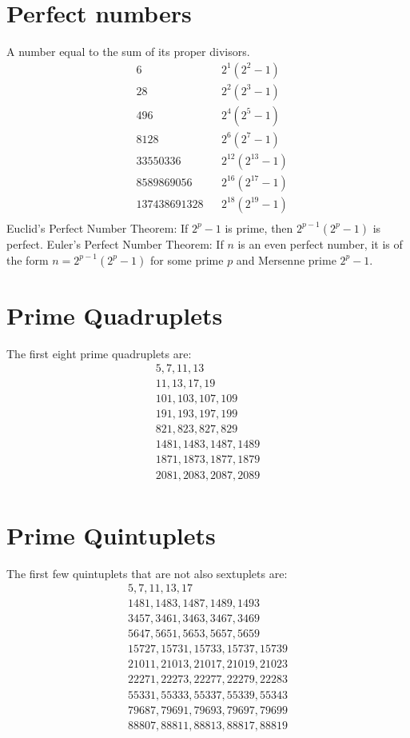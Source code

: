 \documentclass[12pt]{article}
\begin{document}
\section*{Perfect numbers}
A number equal to the sum of its proper divisors.
\begin{align*}
& 6              && 2^{1}(2^{2} -1) \\
& 28             && 2^{2}(2^{3} -1) \\
& 496            && 2^{4}(2^{5} -1) \\
& 8128           && 2^{6}(2^{7} -1) \\
& 33550336       && 2^{12}(2^{13} -1) \\
& 8589869056     && 2^{16}(2^{17} -1) \\
& 137438691328   && 2^{18}(2^{19} -1) \\
\end{align*}
Euclid's Perfect Number Theorem: If $2^{p}-1$ is prime, then $2^{p-1}(2^{p}-1)$ is perfect. Euler's Perfect Number Theorem: If $n$ is an even perfect number, it is of the form $n=2^{p-1}(2^{p}-1)$ for some prime $p$ and Mersenne prime $2^{p}-1$.


\section*{Prime Quadruplets}
The first eight prime quadruplets are: 
\begin{align*}
5, 7, 11, 13\\ 
11, 13, 17, 19\\ 
101, 103, 107, 109\\ 
191, 193, 197, 199\\
821, 823, 827, 829\\
1481, 1483, 1487, 1489\\
1871, 1873, 1877, 1879\\
2081, 2083, 2087, 2089\\ 
\end{align*}


\section*{Prime Quintuplets}
The first few quintuplets that are not also sextuplets are: 
\begin{align*}
5, 7, 11, 13, 17\\ 
1481, 1483, 1487, 1489, 1493\\
3457, 3461, 3463, 3467, 3469\\
5647, 5651, 5653, 5657, 5659\\
15727, 15731, 15733, 15737, 15739\\
21011, 21013, 21017, 21019, 21023\\
22271, 22273, 22277, 22279, 22283\\
55331, 55333, 55337, 55339, 55343\\
79687, 79691, 79693, 79697, 79699\\
88807, 88811, 88813, 88817, 88819\\  
\end{align*}
\end{document}
